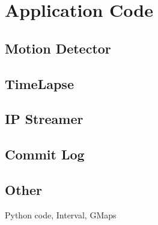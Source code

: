 \documentclass[11pt]{article} %
\begin{document}
\section{Application Code}
\subsection{Motion Detector}
\subsection{TimeLapse}
\subsection{IP Streamer}
\subsection{Commit Log}
\subsection{Other}{Python code, Interval, GMaps}
\end{document}
